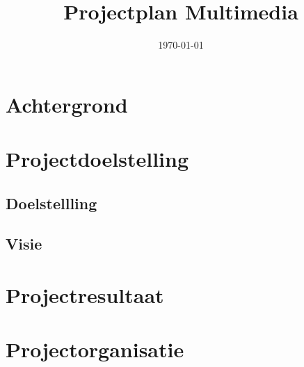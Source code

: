 \documentclass{uva-inf-article}
\title{Projectplan Multimedia}
\date{\today}
\begin{document}
\maketitle



\section{Achtergrond}
\lipsum[31]


\section{Projectdoelstelling}
\lipsum[32]

\subsection{Doelstellling}
\lipsum[33]

\subsection{Visie}
\lipsum[34]


\section{Projectresultaat}
\lipsum[35]


\section{Projectorganisatie}
\lipsum[36]
\end{document}

